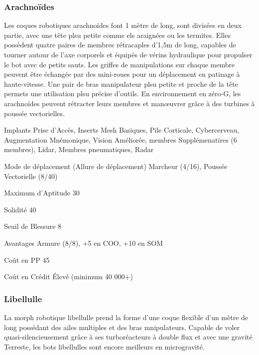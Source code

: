 \subsubsection{Arachnoïdes} \label{sec:starting-arachnoids} 

Les coques robotiques arachnoïdes font 1 mètre de long, sont divisées en deux partie, avec une tête plsu petite comme els araignées ou les termites. Elles possèdent quatre paires de membres rétracaples d'1,5m de long, capables de tourner autour de l'axe corporels et équipés de vérins hydraulique pour propulser le bot avec de petits sauts. Les griffes de manipulations sur chaque membre peuvent être échangée par des mini-roues pour un déplacement en patinage à haute-vitesse. Une pair de bras manipulateur plsu petite et proche de la tête permets une utilisation plsu précise d'outils. En environnement en zéro-G, les arachnoïdes peuvent rétracter leurs membres et manœuvrer grâce à des turbines à poussée vectorielles. 

\begin{description*} \item[Implants] Prise d'Accès, Inserts Mesh Basiques, Pile Corticale, Cybercerveau, Augmentation Mnémonique, Vision Améliorée, membres Supplémenatires (6 membres), Lidar, Membres pneumatiques, Radar\item[Mode de déplacement](Allure de déplacement) Marcheur (4/16), Poussée Vectorielle (8/40)\item[Maximum d'Aptitude] 30 \item[Solidité] 40 \item[Seuil de Blessure] 8 \item[Avantages] Armure (8/8), +5 en COO, +10 en SOM \item[Coût en PP] 45 \item[Coût en Crédit] Élevé (minimum 40 000+) \end{description*} 

\subsubsection{Libellulle} \label{sec:starting-dragonfly} 

La morph robotique libellulle prend la forme d'une coque flexible d'un mètre de long possédant des ailes multiples et des bras mnipulateurs. Capable de voler quasi-silencieusement grâce à ses turboréacteurs à double flux et avec une gravité Terreste, les bots libellulles sont encore meilleurs en microgravité. 

